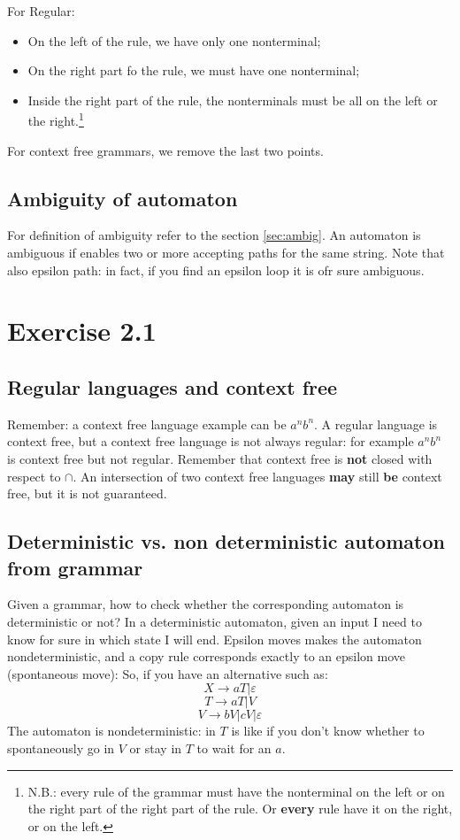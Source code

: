             For Regular:
            \begin{itemize}
                \item On the left of the rule, we have only one nonterminal;
                \item On the right part fo the rule, we must have one nonterminal;
                \item Inside the right part of the rule, the nonterminals must be all on the left or the right.\footnote{N.B.: every rule of the grammar must have 
                the nonterminal on the left or on the right part of the right part of the rule. Or \textbf{every} rule have it on the right, or on the left.}
            \end{itemize}
            For context free grammars, we remove the last two points.
        \subsection{Ambiguity of automaton}
            For definition of ambiguity refer to the section \ref{sec:ambig}.
            An automaton is ambiguous if enables two or more accepting paths for the same string. Note that also epsilon path: in fact, if you find an epsilon loop
            it is ofr sure ambiguous.
    \section{Exercise 2.1}
        \subsection{Regular languages and context free}
            Remember: a context free language example can be $a^nb^n$. A regular language is context free, but a context free language is not always regular: for example
            $a^nb^n$ is context free but not regular. Remember that context free is \textbf{not} closed with respect to $\cap$. An intersection of two context free 
            languages \textbf{may} still \textbf{be} context free, but it is not guaranteed.
        \subsection{Deterministic vs. non deterministic automaton from grammar}
            Given a grammar, how to check whether the corresponding automaton is deterministic or not? In a deterministic automaton, given an input I need to know for 
            sure in which state I will end. Epsilon moves makes the automaton nondeterministic, and a copy rule corresponds exactly to an epsilon move (spontaneous move):
            So, if you have an alternative such as:
            $$X\rightarrow aT \vert \varepsilon$$
            $$T\rightarrow aT\vert V$$
            $$V\rightarrow bV\vert cV\vert\varepsilon$$
            The automaton is nondeterministic: in $T$ is like if you don't know whether to spontaneously go in $V$ or stay in $T$ to wait for an $a$.
